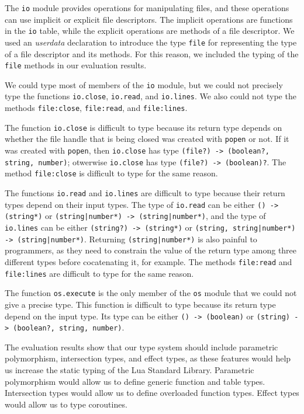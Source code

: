 The \texttt{io} module provides operations for manipulating files,
and these operations can use implicit or explicit file descriptors.
The implicit operations are functions in the \texttt{io} table,
while the explicit operations are methods of a file descriptor.
We used an \emph{userdata} declaration to introduce the type
\texttt{file} for representing the type of a file descriptor
and its methods.
For this reason, we included the typing of the \texttt{file}
methods in our evaluation results.

We could type most of members of the \texttt{io} module,
but we could not precisely type the functions \texttt{io.close},
\texttt{io.read}, and \texttt{io.lines}.
We also could not type the methods \texttt{file:close},
\texttt{file:read}, and \texttt{file:lines}.

The function \texttt{io.close} is difficult to type
because its return type depends on whether the file handle that is
being closed was created with \texttt{popen} or not.
If it was created with \texttt{popen}, then \texttt{io.close}
has type \texttt{(file?) -> (boolean?, string, number)};
otwerwise \texttt{io.close} has type \texttt{(file?) -> (boolean)?}.
The method \texttt{file:close} is difficult to type for the same reason.

The functions \texttt{io.read} and \texttt{io.lines} are difficult
to type because their return types depend on their input types.
The type of \texttt{io.read} can be either \texttt{() -> (string*)}
or \texttt{(string|number*) -> (string|number*)}, and
the type of \texttt{io.lines} can be either \texttt{(string?) -> (string*)}
or \texttt{(string, string|number*) -> (string|number*)}.
Returning \texttt{(string|number*)} is also painful to programmers, as
they need to constrain the value of the return type among three
different types before cocatenating it, for example.
The methods \texttt{file:read} and \texttt{file:lines} are difficult
to type for the same reason.

The function \texttt{os.execute} is the only member of the \texttt{os}
module that we could not give a precise type.
This function is difficult to type because its return type depend on
the input type.
Its type can be either \texttt{() -> (boolean)} or
\texttt{(string) -> (boolean?, string, number)}.

The evaluation results show that our type system should include
parametric polymorphism, intersection types, and effect types,
as these features would help us increase the static typing of the
Lua Standard Library.
Parametric polymorphism would allow us to define generic function and table types.
Intersection types would allow us to define overloaded function types.
Effect types would allow us to type coroutines.

